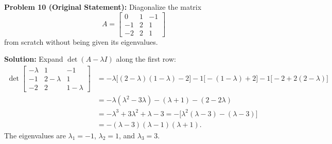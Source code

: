 \documentclass[11pt, letterpaper]{article}
\theoremstyle{definition}
\theoremstyle{remark}
\begin{document}
\vspace{0.8em}
\textbf{Problem 10 (Original Statement):}
Diagonalize the matrix
\[
A = \begin{bmatrix} 0 & 1 & -1 \\ -1 & 2 & 1 \\ -2 & 2 & 1 \end{bmatrix}
\]
from scratch without being given its eigenvalues.

\textbf{Solution:}
Expand $\det(A - \lambda I)$ along the first row:
\begin{align*}
\det\begin{bmatrix} -\lambda & 1 & -1 \\ -1 & 2 - \lambda & 1 \\ -2 & 2 & 1 - \lambda \end{bmatrix}
&= -\lambda\bigl[(2-\lambda)(1-\lambda) - 2\bigr] - 1\bigl[-(1-\lambda) + 2\bigr] - 1\bigl[-2 + 2(2-\lambda)\bigr] \\
&= -\lambda(\lambda^{2} - 3\lambda) - (\lambda + 1) - (2 - 2\lambda) \\
&= -\lambda^{3} + 3\lambda^{2} + \lambda - 3 = -\bigl[\lambda^{2}(\lambda - 3) - (\lambda - 3)\bigr] \\
&= -(\lambda - 3)(\lambda - 1)(\lambda + 1).
\end{align*}
The eigenvalues are $\lambda_{1} = -1$, $\lambda_{2} = 1$, and $\lambda_{3} = 3$.
\end{document}
